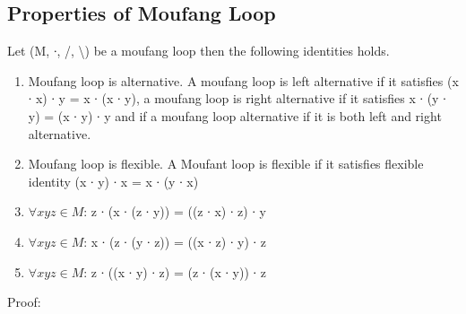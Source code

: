 \subsection{Properties of Moufang Loop}
Let (M, ∙, /, \textbackslash ) be a moufang loop then the following identities holds.
\begin{enumerate}
\item Moufang loop is alternative. A moufang loop is left alternative if it satisfies (x ∙ x) ∙ y = x ∙ (x ∙ y), a moufang loop is right alternative if it satisfies x ∙ (y ∙ y) = (x ∙ y) ∙ y and if a moufang loop alternative if it is both left and right alternative. 
\item Moufang loop is flexible. A Moufant loop is flexible if it satisfies flexible identity (x ∙ y) ∙ x = x ∙ (y ∙ x)
\item \(\forall x y z \in M\): z ∙ (x ∙ (z ∙ y)) = ((z ∙ x) ∙ z) ∙ y
\item \(\forall x y z \in M\): x ∙ (z ∙ (y ∙ z)) = ((x ∙ z) ∙ y) ∙ z 
\item \(\forall x y z \in M\): z ∙ ((x ∙ y) ∙ z) = (z ∙ (x ∙ y)) ∙ z 
\end{enumerate}
Proof:
